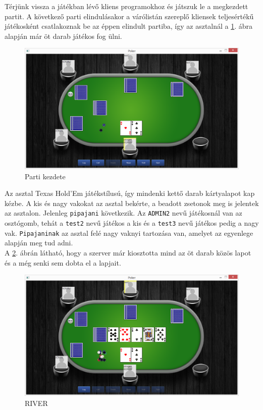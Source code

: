 Térjünk vissza a játékban lévő kliens programokhoz és játszuk le a megkezdett partit. A következő parti elindulásakor a várólistán szereplő kliensek teljesértékű játékosként csatlakoznak be az éppen elindult partiba, így az asztalnál a \ref{fig:parti_2}. ábra alapján már öt darab játékos fog ülni.
 \begin{figure}[h!]
  \caption{Parti kezdete}
  \label{fig:parti_2}
  \centering
    \includegraphics[width=\linewidth]{user-documentation/images/parti/parti_2.jpg}
\end{figure}
Az asztal Texas Hold'Em játékstílusú, így mindenki kettő darab kártyalapot kap kézbe. A kis és nagy vakokat az asztal bekérte, a beadott zsetonok meg is jelentek az asztalon. Jelenleg \texttt{pipajani} következik. Az \texttt{ADMIN2} nevű játékosnál van az osztógomb, tehát a \texttt{test2} nevű játékos a kis és a \texttt{test3} nevű játékos pedig a nagy vak. \texttt{Pipajaninak} az asztal felé nagy vaknyi tartozása van, amelyet az egyenlege alapján meg tud adni. \\
A \ref{fig:parti_3}. ábrán látható, hogy a szerver már kiosztotta mind az öt darab közös lapot és a még senki sem dobta el a lapjait.
 \begin{figure}[h!]
  \caption{RIVER}
  \label{fig:parti_3}
  \centering
    \includegraphics[width=\linewidth]{user-documentation/images/parti/parti_3.jpg}
\end{figure}
